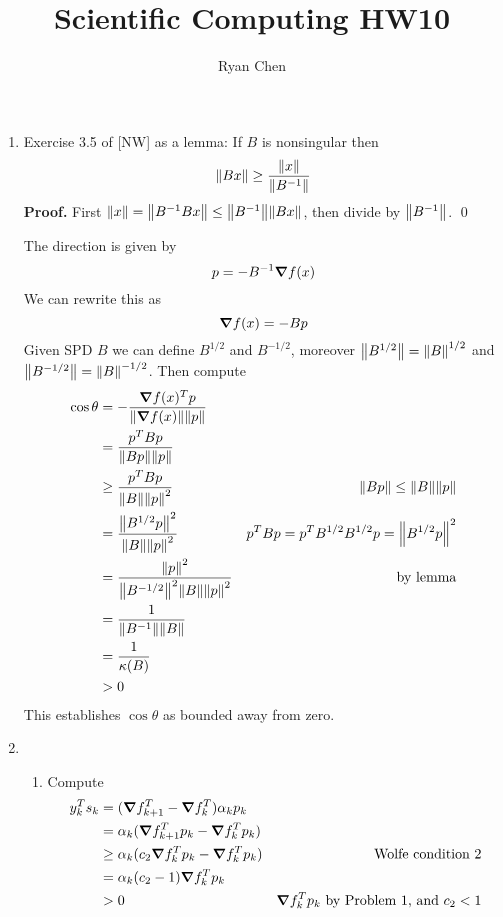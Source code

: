 \documentclass{article}
\title{Scientific Computing HW10}
\author{Ryan Chen}
\def\tbf#1{\textbf{#1}}
\newcommand{\inv}{^{-1}}
\newcommand{\pf}{\tbf{Proof. }}
\renewcommand{\t}{\theta}
\renewcommand{\a}{\alpha}
\begin{document}
	
\maketitle
	


\begin{enumerate}
	
	
	
	\item Exercise 3.5 of [NW] as a lemma: If $B$ is nonsingular then
	\[\norm{Bx} \ge \frac{\norm{x}}{\norm{B\inv}}\]
	\pf First $\norm{x} = \norm{B\inv Bx} \le \norm{B\inv}\norm{Bx}$, then divide by $\norm{B\inv}$. \qed
	
	The direction is given by
	\[p = -B\inv\grad f(x)\]
	We can rewrite this as
	\[\grad f(x) = -Bp\]
	Given SPD $B$ we can define $B^{1/2}$ and $B^{-1/2}$, moreover $\norm{B^{1/2}}=\norm{B}^{1/2}$ and $\norm{B^{-1/2}}=\norm{B}^{-1/2}$. Then compute
	\begin{align*}
		\cos\t &= -\frac{\grad f(x)^Tp}{\norm{\grad f(x)}\norm{p}} \\
		&= \frac{p^TBp}{\norm{Bp}\norm{p}} \\
		&\ge \frac{p^TBp}{\norm{B}\norm{p}^2} & \norm{Bp} \le \norm{B}\norm{p} \\
		&= \frac{\norm{B^{1/2}p}^2}{\norm{B}\norm{p}^2} & p^TBp = p^TB^{1/2}B^{1/2}p = \norm{B^{1/2}p}^2 \\
		&= \frac{\norm{p}^2}{\norm{B^{-1/2}}^2\norm{B}\norm{p}^2} & \text{by lemma} \\
		&= \frac{1}{\norm{B\inv}\norm{B}} \\
		&= \frac{1}{\kappa(B)} \\
		&> 0
	\end{align*}
	This establishes $\cos\t$ as bounded away from zero.
	
	
	\pagebreak
	
	
	
	\item
	
	\begin{enumerate}
		
		
		
		\item Compute
		\begin{align*}
			y_k^Ts_k &= (\grad f_{k+1}^T - \grad f_k^T)\a_kp_k \\
			&= \a_k(\grad f_{k+1}^Tp_k - \grad f_k^Tp_k) \\
			&\ge \a_k(c_2\grad f_k^Tp_k - \grad f_k^Tp_k) & \text{Wolfe condition 2} \\
			&= \a_k(c_2-1)\grad f_k^Tp_k \\
			&> 0 & \text{$\grad f_k^Tp_k$ by Problem 1, and $c_2<1$}
		\end{align*}
		

\end{enumerate}
\end{enumerate}
\end{document}

